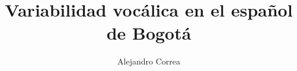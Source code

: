 \author{Alejandro Correa}
\title{Variabilidad vocálica en el español de Bogotá}
\subtitle{}
\renewcommand{\lsSeries}{dummyseries}
\renewcommand{\lsSeriesNumber}{ }
